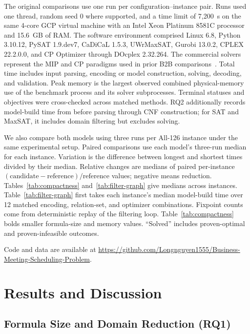 \documentclass[conference,a4paper]{IEEEtran}
\newcommand{\revised}[1]{#1}
\begin{document}
\revised{The original comparisons use one run per configuration--instance pair.  Runs used one thread, random seed 0 where supported, and a time limit of 7{,}200~s on the same 4-core GCP virtual machine with an Intel Xeon Platinum 8581C processor and 15.6~GB of RAM.  The software environment comprised Linux 6.8, Python 3.10.12, PySAT 1.9.dev7, CaDiCaL 1.5.3, UWrMaxSAT, Gurobi 13.0.2, CPLEX 22.2.0.0, and CP Optimizer through DOcplex 2.32.264. The commercial solvers represent the MIP and CP paradigms used in prior B2B comparisons~\cite{pesant2015,bofill2022}.  Total time includes input parsing, encoding or model construction, solving, decoding, and validation.  Peak memory is the largest observed combined physical-memory use of the benchmark process and its solver subprocesses. Terminal statuses and objectives were cross-checked across matched methods. RQ2 additionally records model-build time from before parsing through CNF construction; for SAT and MaxSAT, it includes domain filtering but excludes solving.}

\revised{We also compare both models using three runs per All-126 instance under the same experimental setup. Paired comparisons use each model's three-run median for each instance. Variation is the difference between longest and shortest times divided by their median.} \revised{Relative changes are medians of paired per-instance $(\text{candidate}-\text{reference})/\text{reference}$ values; negative means reduction. Tables~\ref{tab:compactness} and~\ref{tab:filter-graph} give medians across instances. Table~\ref{tab:filter-graph} first takes each instance's median model-build time over 12 matched encoding, relation-set, and optimizer combinations. Fixpoint counts come from deterministic replay of the filtering loop. Table~\ref{tab:compactness} bolds smaller formula-size and memory values. ``Solved'' includes proven-optimal and proven-infeasible outcomes.}

{\raggedright Code and data are available at \url{https://github.com/Longnguyen1555/Business-Meeting-Scheduling-Problem}. \par}

\section{Results and Discussion}
\label{sec:results}

\subsection{Formula Size and Domain Reduction (RQ1)}
\end{document}
